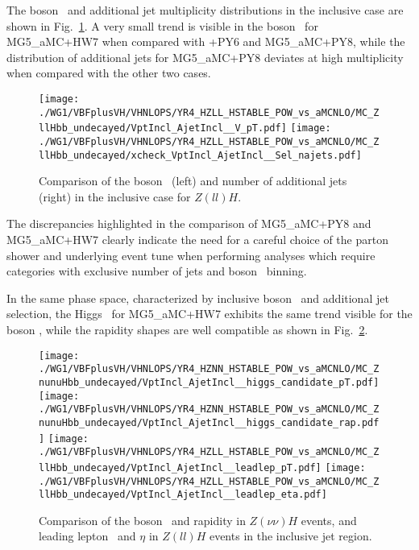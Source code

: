The boson \pt\ and additional jet multiplicity distributions in the inclusive case are shown in Fig.~\ref{fig:stable__incl_vpt_jets}.
A very small trend is visible in the boson \pt\ for {\sc MG5\_aMC}+HW7 when compared with \POWHEG{}+PY6 and {\sc MG5\_aMC}+PY8,
while the distribution of additional jets for {\sc MG5\_aMC}+PY8 deviates at high multiplicity when compared with the other two cases.
\begin{figure}[hptb]
\centering
\texttt{[image: ./WG1/VBFplusVH/VHNLOPS/YR4\_HZLL\_HSTABLE\_POW\_vs\_aMCNLO/MC\_ZllHbb\_undecayed/VptIncl\_AjetIncl\_\_V\_pT.pdf]}
\texttt{[image: ./WG1/VBFplusVH/VHNLOPS/YR4\_HZLL\_HSTABLE\_POW\_vs\_aMCNLO/MC\_ZllHbb\_undecayed/xcheck\_VptIncl\_AjetIncl\_\_Sel\_najets.pdf]}
\caption{Comparison of the boson \pt\ (left) and number of additional jets (right) in the inclusive case for $Z(ll)H$.}
\label{fig:stable__incl_vpt_jets}
\end{figure}
%
The discrepancies highlighted in the comparison of {\sc MG5\_aMC}+PY8 and {\sc MG5\_aMC}+HW7 clearly indicate the need 
for a careful choice of the parton shower and underlying event tune when performing analyses 
which require categories with exclusive number of jets and boson \pt\ binning.

In the same phase space, characterized by inclusive boson \pt\ and additional jet selection, the Higgs \pt\ for {\sc MG5\_aMC}+HW7 exhibits 
the same trend visible for the boson \pt, while the rapidity shapes are well compatible
as shown in Fig.~\ref{fig:stable__incl_hig}.
\begin{figure}[hptb]
\centering
\texttt{[image: ./WG1/VBFplusVH/VHNLOPS/YR4\_HZNN\_HSTABLE\_POW\_vs\_aMCNLO/MC\_ZnunuHbb\_undecayed/VptIncl\_AjetIncl\_\_higgs\_candidate\_pT.pdf]}
\texttt{[image: ./WG1/VBFplusVH/VHNLOPS/YR4\_HZNN\_HSTABLE\_POW\_vs\_aMCNLO/MC\_ZnunuHbb\_undecayed/VptIncl\_AjetIncl\_\_higgs\_candidate\_rap.pdf]}
\texttt{[image: ./WG1/VBFplusVH/VHNLOPS/YR4\_HZLL\_HSTABLE\_POW\_vs\_aMCNLO/MC\_ZllHbb\_undecayed/VptIncl\_AjetIncl\_\_leadlep\_pT.pdf]}
\texttt{[image: ./WG1/VBFplusVH/VHNLOPS/YR4\_HZLL\_HSTABLE\_POW\_vs\_aMCNLO/MC\_ZllHbb\_undecayed/VptIncl\_AjetIncl\_\_leadlep\_eta.pdf]}
\caption{Comparison of the boson \pt\ and rapidity in $Z(\nu\nu)H$ events, and leading lepton \pt\ and $\eta$ in $Z(ll)H$ events in the inclusive jet region.}
\label{fig:stable__incl_hig}
\end{figure}

